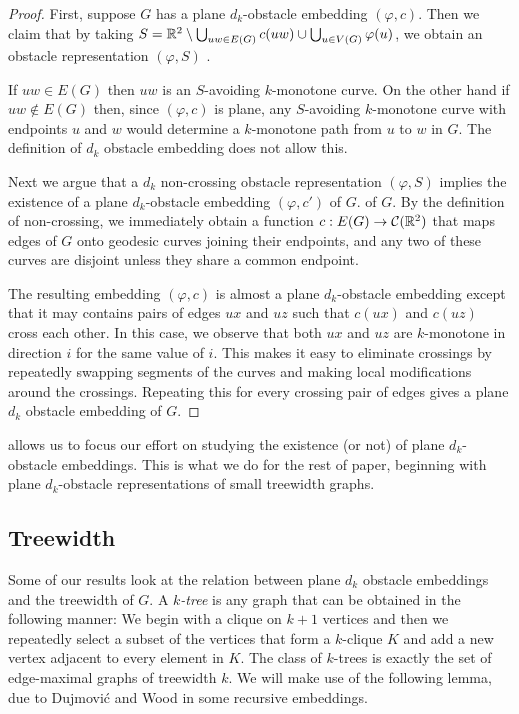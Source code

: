 \documentclass{patmorin}
\begin{document}
\begin{proof}
   First, suppose $G$ has a plane $d_k$-obstacle embedding $(\varphi,c)$.
   Then we claim that by taking $S= \mathbb{R}^2\setminus \bigcup_{uw\in E(G)}
   c(uw)\cup \bigcup_{u\in V(G)}\varphi(u)$, we obtain an obstacle
   representation $(\varphi,S)$ .

   If $uw\in E(G)$ then $uw$ is an $S$-avoiding $k$-monotone curve.
   On the other hand if $uw\not\in E(G)$ then, since $(\varphi,c)$
   is plane, any $S$-avoiding $k$-monotone curve with endpoints $u$
   and $w$ would determine a $k$-monotone path from $u$ to $w$ in $G$.
   The definition of $d_k$ obstacle embedding does not allow this.

   Next we argue that a $d_k$ non-crossing obstacle representation
   $(\varphi, S)$ implies the existence of a plane $d_k$-obstacle
   embedding $(\varphi, c')$ of $G$.  of $G$.  By the
   definition of non-crossing, we immediately obtain a function
   $c:E(G)\to\mathcal{C}(\mathbb{R}^2)$ that maps edges of $G$ onto geodesic
   curves joining their endpoints, and any two of these curves are
   disjoint unless they share a common endpoint.

   The resulting embedding $(\varphi,c)$ is almost a plane $d_k$-obstacle
   embedding except that it may contains pairs of edges $ux$ and $uz$
   such that $c(ux)$ and $c(uz)$ cross each other.  In this case,
   we observe that both $ux$ and $uz$ are $k$-monotone in direction
   $i$ for the same value of $i$.  This makes it easy to eliminate
   crossings by repeatedly swapping segments of the curves and making
   local modifications around the crossings.  Repeating this for every
   crossing pair of edges gives a plane $d_k$ obstacle embedding of $G$.
\end{proof}

 allows us to focus our effort on studying the existence
(or not) of plane $d_k$-obstacle embeddings.  This is what we do for
the rest of paper, beginning with plane $d_k$-obstacle representations
of small treewidth graphs.

\subsection{Treewidth}

Some of our results look at the relation between plane $d_k$ obstacle
embeddings and the treewidth of $G$.  A \emph{$k$-tree} is any graph that
can be obtained in the following manner:  We begin with a clique on $k+1$
vertices and then we repeatedly select a subset of the vertices that
form a $k$-clique $K$ and add a new vertex adjacent to every element
in $K$.  The class of $k$-trees is exactly the set of edge-maximal
graphs of treewidth $k$.  We will make use of the following lemma,
due to Dujmovi\'c and Wood \cite[Lemma~1]{dujmovic.wood:graph2007}
in some recursive embeddings.
\end{document}
